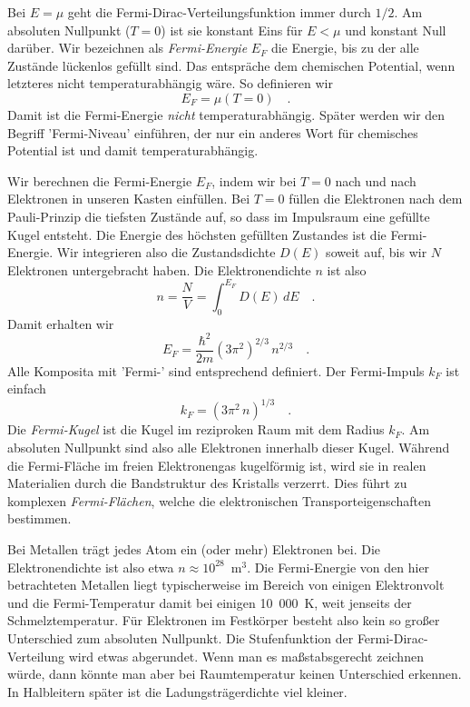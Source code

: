 Bei $E = \mu$ geht die Fermi-Dirac-Verteilungsfunktion immer durch $1/2$. Am absoluten Nullpunkt ($T=0$) ist sie konstant Eins für $E < \mu$ und konstant Null darüber. Wir bezeichnen als \emph{Fermi-Energie} $E_F$ die Energie, bis zu der alle Zustände lückenlos gefüllt sind. Das entspräche dem chemischen Potential, wenn letzteres nicht temperaturabhängig wäre. So definieren wir
\begin{equation}
    E_F = \mu (T = 0) \quad .
\end{equation}
Damit ist die Fermi-Energie \emph{nicht} temperaturabhängig. Später werden wir den Begriff 'Fermi-Niveau' einführen, der nur ein anderes Wort für chemisches Potential ist und damit temperaturabhängig.


Wir berechnen die Fermi-Energie $E_F$, indem wir bei $T=0$ nach und nach Elektronen in unseren Kasten einfüllen.
Bei $T=0$ füllen die Elektronen nach dem Pauli-Prinzip die tiefsten Zustände auf, so dass im Impulsraum eine gefüllte Kugel entsteht. Die Energie des höchsten gefüllten Zustandes ist die Fermi-Energie.
Wir integrieren also die Zustandsdichte $D(E)$ soweit auf, bis wir $N$ Elektronen untergebracht haben. Die Elektronendichte $n$ ist also
\begin{equation}
    n = \frac{N}{V} = \int_0^{E_F} D(E) \, dE \quad .
\end{equation}
Damit erhalten wir
\begin{equation}
    E_F = \frac{\hbar^2}{2m} (3 \pi^2)^{2/3} \, n^{2/3} \quad .
\end{equation}
Alle Komposita mit 'Fermi-' sind entsprechend definiert. Der Fermi-Impuls $k_F$ ist einfach
\begin{equation}
    k_F = (3 \pi^2 \, n)^{1/3} \quad .
\end{equation}
Die \emph{Fermi-Kugel} ist die Kugel im reziproken Raum mit dem Radius $k_F$. Am absoluten Nullpunkt sind also alle Elektronen innerhalb dieser Kugel. Während die Fermi-Fläche im freien Elektronengas kugelförmig ist, wird sie in realen Materialien durch die Bandstruktur des Kristalls verzerrt. Dies führt zu komplexen \emph{Fermi-Flächen}, welche die elektronischen Transporteigenschaften bestimmen.


Bei Metallen trägt jedes Atom ein (oder mehr) Elektronen bei. Die Elektronendichte ist also etwa $n \approx 10^{28}$~m$^3$.
Die Fermi-Energie von den hier betrachteten Metallen liegt typischerweise im Bereich von einigen Elektronvolt und die Fermi-Temperatur damit bei einigen 10~000~K, weit jenseits der Schmelztemperatur. Für Elektronen im Festkörper besteht also kein so großer Unterschied zum absoluten Nullpunkt. Die Stufenfunktion der Fermi-Dirac-Verteilung wird etwas abgerundet. Wenn man es maßstabsgerecht zeichnen würde, dann könnte man aber bei Raumtemperatur keinen Unterschied erkennen. In Halbleitern später ist die Ladungsträgerdichte viel kleiner.


